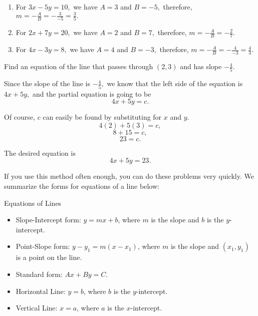 \begin{solution}
\begin{enumerate}
    \item For $3x - 5y = 10,$ we have $A = 3$ and $B = -5,$ therefore, $m = -\frac{A}{B} = -\frac{3}{-5} = \frac{3}{5}.$
    
    \item For $2x + 7y = 20,$ we have $A = 2$ and $B = 7,$ therefore, $m = -\frac{A}{B} = -\frac{2}{7}.$
    
    \item For $4x - 3y = 8,$ we have $A = 4$ and $B = -3,$ therefore, $m = -\frac{A}{B} = -\frac{4}{-3} = \frac{4}{3}.$
\end{enumerate}
\end{solution}


\begin{example}
Find an equation of the line that passes through $(2, 3)$ and has slope $-\frac{4}{5}.$
\end{example}

\begin{solution}
Since the slope of the line is $-\frac{4}{5},$ we know that the left side of the equation is $4x + 5y,$ and the partial equation is going to be
\[4x + 5y = c.\]

Of course, $c$ can easily be found by substituting for $x$ and $y.$
\[4(2) + 5(3) = c,\]
\[8 + 15 = c,\]
\[23 = c.\]

The desired equation is
\[4x + 5y = 23.\]
\end{solution}

If you use this method often enough, you can do these problems very quickly.    
We summarize the forms for equations of a line below:
\begin{summarybox} Equations of Lines
\begin{itemize}
  \item Slope-Intercept form: $y = mx + b$, where $m$ is the slope and $b$ is the $y$-intercept.
  \item Point-Slope form: $y - y_1 = m(x - x_1)$, where $m$ is the slope and $(x_1, y_1)$ is a point on the line.
  \item Standard form: $Ax + By = C$.
  \item Horizontal Line: $y = b$, where $b$ is the $y$-intercept.
  \item Vertical Line: $x = a$, where $a$ is the $x$-intercept.
\end{itemize}
\end{summarybox}

